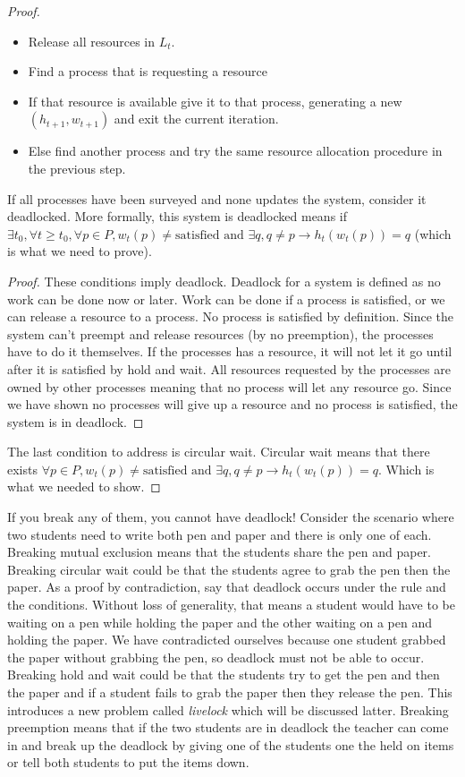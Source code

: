 \begin{proof}
\begin{itemize}
\item Release all resources in $L_t$.
\item Find a process that is requesting a resource
\item If that resource is available give it to that process, generating a new $(h_{t+1}, w_{t+1})$ and exit the current iteration.
\item Else find another process and try the same resource allocation procedure in the previous step.
\end{itemize}

If all processes have been surveyed and none updates the system, consider it deadlocked. More formally, this system is deadlocked means  if $\exists t_0, \forall t \geq t_0, \forall p \in P, w_t(p) \neq \text{satisfied} \text{ and } \exists q, q \neq p \rightarrow h_t(w_t(p)) = q$ (which is what we need to prove). 
\begin{proof} These conditions imply deadlock. 
Deadlock for a system is defined as no work can be done now or later. Work can be done if a process is satisfied, or we can release a resource to a process. No process is satisfied by definition. Since the system can't preempt and release resources (by no preemption), the processes have to do it themselves. If the processes has a resource, it will not let it go until after it is satisfied by hold and wait. All resources requested by the processes are owned by other processes meaning that no process will let any resource go. Since we have shown no processes will give up a resource and no process is satisfied, the system is in deadlock.
\end{proof}
The last condition to address is circular wait. Circular wait means that there exists $\forall p \in P, w_t(p) \neq \text{satisfied} \text{ and } \exists q, q \neq p \rightarrow h_t(w_t(p)) = q$. Which is what we needed to show.
\end{proof}

If you break any of them, you cannot have deadlock! Consider the scenario where two students need to write both pen and paper and there is only one of each. Breaking mutual exclusion means that the students share the pen and paper. Breaking circular wait could be that the students agree to grab the pen then the paper. As a proof by contradiction, say that deadlock occurs under the rule and the conditions. Without loss of generality, that means a student would have to be waiting on a pen while holding the paper and the other waiting on a pen and holding the paper. We have contradicted ourselves because one student grabbed the paper without grabbing the pen, so deadlock must not be able to occur. Breaking hold and wait could be that the students try to get the pen and then the paper and if a student fails to grab the paper then they release the pen. This introduces a new problem called \textit{livelock} which will be discussed latter. Breaking preemption means that if the two students are in deadlock the teacher can come in and break up the deadlock by giving one of the students one the held on items or tell both students to put the items down.

